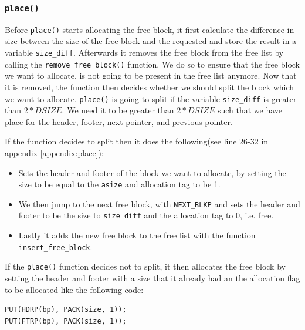 \documentclass[11pt]{article}
\newcommand{\code}[1]{{\colorbox{lightgray!15}{\color{black}\texttt{#1}}}}
\begin{document}
\subsubsection{\code{place()}}
Before \code{place()} starts allocating the free block, it first calculate the difference in size between the size of the free block and the requested and store the result in a variable \code{size\_diff}.
Afterwards it removes the free block from the free list by calling the \code{remove\_free\_block()} function. We do so to ensure that the free block we want to allocate, 
is not going to be present in the free list anymore. Now that it is removed, the function then decides whether we should split the block which we want to allocate. 
\code{place()} is going to split if the variable \code{size\_diff} is greater than $2 * DSIZE$.
We need it to be greater than $2 * DSIZE$ such that we have place for the header, footer, next pointer, and previous pointer. 

If the function decides to split then it does the following(see line 26-32 in appendix \ref{appendix:place}): 
\begin{itemize}
    \item Sets the header and footer of the block we want to allocate, by setting the size to be equal to the \code{asize} and allocation tag to be 1.
    \item We then jump to the next free block, with \code{NEXT\_BLKP} and sets the header and footer to be the size to \code{size\_diff} and the allocation tag to 0, i.e. free.
    \item Lastly it adds the new free block to the free list with the function \code{insert\_free\_block}.
\end{itemize}

If the \code{place()} function decides not to split, it then allocates the free block by setting the header and footer with a size that it already had an the allocation flag to be allocated like the following code:
\begin{lstlisting}
PUT(HDRP(bp), PACK(size, 1));
PUT(FTRP(bp), PACK(size, 1)); 
\end{lstlisting}
\end{document}
